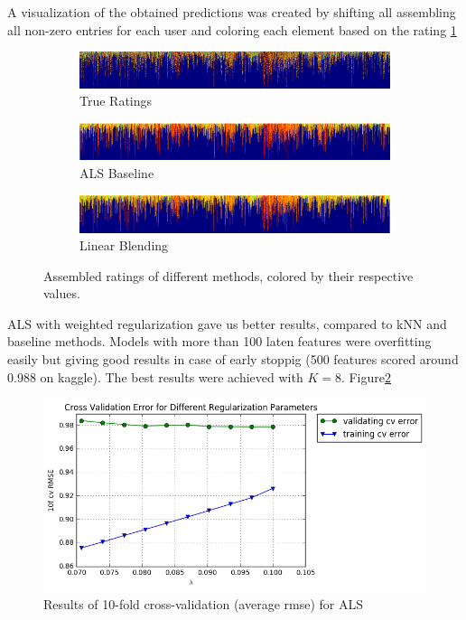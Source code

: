 A visualization of the obtained predictions was created by shifting all
assembling all non-zero entries for each user and coloring each element
based on the rating \ref{fig:matrix}

\begin{figure}[!tbp]
  \begin{subfigure}[b]{0.99\columnwidth}
    \includegraphics[width=.99\columnwidth]{figures/matrix_validation_clipped.png}
    \caption{True Ratings}
  \end{subfigure}
  \hfill
  \begin{subfigure}[b]{0.99\columnwidth}
    \includegraphics[width=.99\columnwidth]{figures/matrix_validation_1_clipped.png}
    \caption{ALS Baseline}
  \end{subfigure}
  \begin{subfigure}[b]{0.99\columnwidth}
    \includegraphics[width=.99\columnwidth]{figures/matrix_blending_clipped.png}
    \caption{Linear Blending}
  \end{subfigure}
  \caption{Assembled ratings of different methods, colored by their respective
  values.}
  \label{fig:matrix}
\end{figure}


ALS with weighted regularization gave us better results, compared to kNN and baseline methods. Models with more than 100 laten features were overfitting easily but giving good results in case of early stoppig (500 features scored around 0.988 on kaggle). The best results were achieved with $K=8$. Figure\ref{fig:als_cv}
 
\begin{figure}[!tbp]
  \centering
  \includegraphics[width=.9\columnwidth]{figures/scaled_trainavg_testavg.png}
  \caption{Results of 10-fold cross-validation (average rmse) for ALS}
  \label{fig:als_cv}
  \centering
\end{figure}

